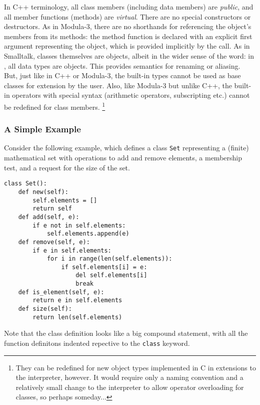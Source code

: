 In C++ terminology, all class members (including data members) are
{\em public},
and all member functions (methods) are
{\em virtual}.
There are no special constructors or destructors.
As in Modula-3, there are no shorthands for referencing the object's
members from its methods: the method function is declared with an
explicit first argument representing the object, which is provided
implicitly by the call.
As in Smalltalk, classes themselves are objects, albeit in the wider
sense of the word: in \Python, all data types are objects.
This provides semantics for renaming or aliasing.
But, just like in C++ or Modula-3, the built-in types cannot be used as
base classes for extension by the user.
Also, like Modula-3 but unlike C++, the built-in operators with special
syntax (arithmetic operators, subscripting etc.) cannot be redefined for
class members.%
\footnote{
	They can be redefined for new object types implemented in C in
	extensions to the interpreter, however.  It would require only a
	naming convention and a relatively small change to the
	interpreter to allow operator overloading for classes, so
	perhaps someday...
}

\subsubsection{A Simple Example}

Consider the following example, which defines a class {\tt Set}
representing a (finite) mathematical set with operations to add and
remove elements, a membership test, and a request for the size of the
set.
\bcode\begin{verbatim}
class Set():
    def new(self):
        self.elements = []
        return self
    def add(self, e):
        if e not in self.elements:
            self.elements.append(e)
    def remove(self, e):
        if e in self.elements:
            for i in range(len(self.elements)):
                if self.elements[i] = e:
                    del self.elements[i]
                    break
    def is_element(self, e):
        return e in self.elements
    def size(self):
        return len(self.elements)
\end{verbatim}\ecode
Note that the class definition looks like a big compound statement,
with all the function definitons indented repective to the
{\tt class}
keyword.


